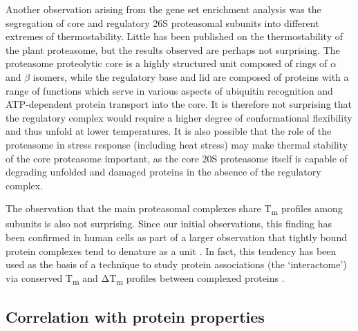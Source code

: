 \documentclass[11pt,letter]{article}\usepackage[]{graphicx}\usepackage[]{color}
\newcommand{\Tm}{T\textsubscript{m}}
\newcommand{\DeltaTm}{Δ\Tm}
\begin{document}
Another observation arising from the gene set enrichment analysis was the
segregation of core and regulatory 26S proteasomal subunits into different
extremes of thermostability. Little has been published on the thermostability
of the plant proteasome, but the results observed are perhaps not surprising.
The proteasome proteolytic core is a highly structured unit composed of rings
of $\alpha$ and $\beta$ isomers, while the regulatory base and lid are
composed of proteins with a range of functions which serve in various aspects
of ubiquitin recognition and ATP-dependent protein transport into the core. It
is therefore not surprising that the regulatory complex would require a higher
degree of conformational flexibility and thus unfold at lower temperatures. It
is also possible that the role of the proteasome in stress response (including
heat stress) may make thermal stability of the core proteasome important, as
the core 20S proteasome itself is capable of degrading unfolded and damaged
proteins in the absence of the regulatory complex.

The observation that the main proteasomal complexes share \Tm{} profiles among
subunits is also not surprising. Since our initial observations, this finding
has been confirmed in human cells as part of a larger observation that tightly
bound protein complexes tend to denature as a unit
\cite{becher_pervasive_2018}. In fact, this tendency has been used as the basis
of a technique to study protein associations (the `interactome') via conserved \Tm{} and
\DeltaTm{} profiles between complexed proteins \cite{tan_thermal_2018}.


\subsection*{Correlation with protein properties}
\end{document}
